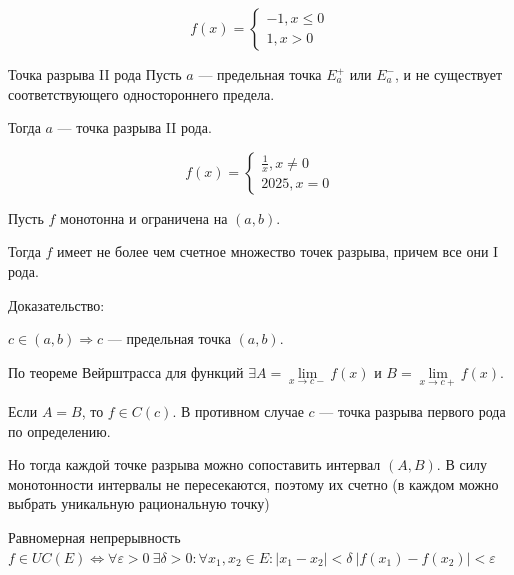 \begin{example}{}{}
    \[
        f(x)
        =
        \begin{cases}
            -1, x \leq 0
            \\
            1, x > 0
        \end{cases}
    \]
\end{example}

\begin{defn}{Точка разрыва II рода}{}
    Пусть \( a \) --- предельная точка \( E_a^+ \) или \( E_a^- \), 
    и не существует соответствующего одностороннего предела.

    Тогда \( a \) --- точка разрыва II рода.
\end{defn}

\begin{example}{}{}
    \[
        f(x)
        =
        \begin{cases}
            \frac{1}{x}, x \neq 0
            \\
            2025, x = 0
        \end{cases}
    \]
\end{example}

\begin{thrm}{}{}
    Пусть \( f \) монотонна и ограничена на \( ( a, b ) \).

    Тогда \( f \) имеет не более чем счетное множество точек разрыва, причем все они I рода.
\end{thrm}

Доказательство:

\( c \in (a, b) \Rightarrow c \) --- предельная точка \( (a, b) \).

По теореме Вейрштрасса для функций \( \exists A = \lim\limits_{x \to c-} f(x) \)
и \( B = \lim\limits_{x \to c+} f(x) \).

Если \( A = B \), то \( f \in C(c) \).
В противном случае \( c \) --- точка разрыва первого рода по определению.

Но тогда каждой точке разрыва можно сопоставить интервал \( (A, B) \).
В силу монотонности интервалы не пересекаются, поэтому их счетно
(в каждом можно выбрать уникальную рациональную точку)

\begin{defn}{Равномерная непрерывность}{}
    \(
        f \in UC(E) \Leftrightarrow \forall \varepsilon > 0 \ \exists \delta > 0 :
        \forall x_1, x_2 \in E : |x_1 - x_2| < \delta \ |f(x_1) - f(x_2)| < \varepsilon
    \)
\end{defn}

